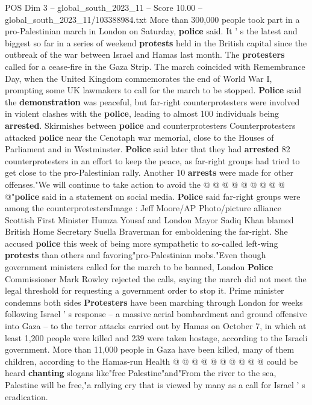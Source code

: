 \begin{textsample}{POS Dim 3 – global\_south\_2023\_11 – Score 10.00 – global\_south\_2023\_11/103388984.txt}  \label{ex:f3_pos_371}
More than 300,000 people took part in a pro-Palestinian march in London on Saturday, \textbf{police} said.
It ' s the latest and biggest so far in a series of weekend \textbf{protests} held in the British capital since the outbreak of the war between Israel and Hamas last month.
The \textbf{protesters} called for a cease-fire in the Gaza Strip.
The march coincided with Remembrance Day, when the United Kingdom commemorates the end of World War I, prompting some UK lawmakers to call for the march to be stopped. \textbf{Police} said the \textbf{demonstration} was peaceful, but far-right counterprotesters were involved in violent clashes with the \textbf{police}, leading to almost 100 individuals being \textbf{arrested}.
Skirmishes between \textbf{police} and counterprotesters Counterprotesters attacked \textbf{police} near the Cenotaph war memorial, close to the Houses of Parliament and in Westminster. \textbf{Police} said later that they had \textbf{arrested} 82 counterprotesters in an effort to keep the peace, as far-right groups had tried to get close to the pro-Palestinian rally.
Another 10 \textbf{arrests} were made for other offenses."We will continue to take action to avoid the @ @ @ @ @ @ @ @ @ @"\textbf{police} said in a statement on social media. \textbf{Police} said far-right groups were among the counterprotestersImage : Jeff Moore/AP Photo/picture alliance Scottish First Minister Humza Yousaf and London Mayor Sadiq Khan blamed British Home Secretary Suella Braverman for emboldening the far-right.
She accused \textbf{police} this week of being more sympathetic to so-called left-wing \textbf{protests} than others and favoring"pro-Palestinian mobs."Even though government ministers called for the march to be banned, London \textbf{Police} Commissioner Mark Rowley rejected the calls, saying the march did not meet the legal threshold for requesting a government order to stop it.
Prime minister condemns both sides \textbf{Protesters} have been marching through London for weeks following Israel ' s response -- a massive aerial bombardment and ground offensive into Gaza -- to the terror attacks carried out by Hamas on October 7, in which at least 1,200 people were killed and 239 were taken hostage, according to the Israeli government.
More than 11,000 people in Gaza have been killed, many of them children, according to the Hamas-run Health @ @ @ @ @ @ @ @ @ @ could be heard \textbf{chanting} slogans like"free Palestine"and"From the river to the sea, Palestine will be free,"a rallying cry that is viewed by many as a call for Israel ' s eradication.

\end{textsample}

